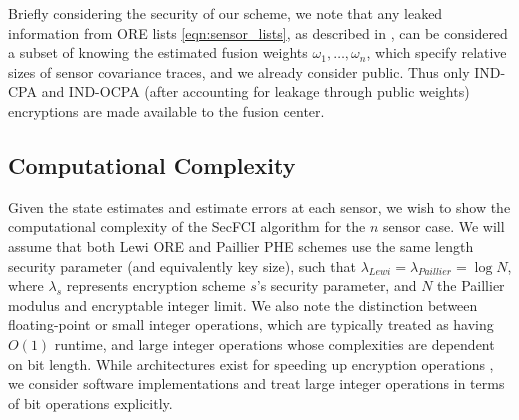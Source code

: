 \documentclass[letterpaper, 10 pt, journal, twoside]{ieeetran}  %
\begin{document}
Briefly considering the security of our scheme, we note that any leaked information from ORE lists \eqref{eqn:sensor_lists}, as described in \cite{chenettePracticalOrderRevealingEncryption2016}, can be considered a subset of knowing the estimated fusion weights $\omega_1,\dots,\omega_n$, which specify relative sizes of sensor covariance traces, and we already consider public. Thus only IND-CPA and IND-OCPA (after accounting for leakage through public weights) encryptions are made available to the fusion center.

\subsection{Computational Complexity} \label{subsec:complexity}
Given the state estimates and estimate errors at each sensor, we wish to show the computational complexity of the SecFCI algorithm for the $n$ sensor case. We will assume that both Lewi ORE and Paillier PHE schemes use the same length security parameter (and equivalently key size), such that $\lambda_{Lewi} = \lambda_{Paillier} = \log{N}$, where $\lambda_{s}$ represents encryption scheme $s$'s security parameter, and $N$ the Paillier modulus and encryptable integer limit. We also note the distinction between floating-point or small integer operations, which are typically treated as having $O(1)$ runtime, and large integer operations whose complexities are dependent on bit length. While architectures exist for speeding up encryption operations \cite{gueronIntelAdvancedEncryption2010}, we consider software implementations and treat large integer operations in terms of bit operations explicitly.
\end{document}

